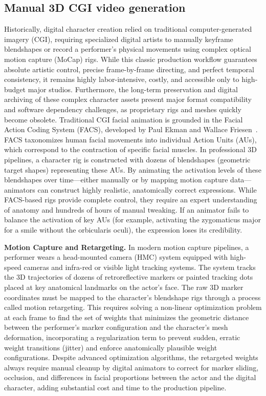 \documentclass[pdflatex,sn-mathphys-num]{sn-jnl}
\theoremstyle{thmstyleone}
\theoremstyle{thmstyletwo}
\theoremstyle{thmstylethree}
\begin{document}
\subsection{Manual 3D CGI video generation}\label{sec:manual_3d}


Historically, digital character creation relied on traditional computer-generated imagery (CGI), requiring specialized digital artists to manually keyframe blendshapes or record a performer's physical movements using complex optical motion capture (MoCap) rigs. While this classic production workflow guarantees absolute artistic control, precise frame-by-frame directing, and perfect temporal consistency, it remains highly labor-intensive, costly, and accessible only to high-budget major studios. Furthermore, the long-term preservation and digital archiving of these complex character assets present major format compatibility and software dependency challenges, as proprietary rigs and meshes quickly become obsolete. Traditional CGI facial animation is grounded in the Facial Action Coding System (FACS), developed by Paul Ekman and Wallace Friesen~\cite{ekman1978facial}. FACS taxonomizes human facial movements into individual Action Units (AUs), which correspond to the contraction of specific facial muscles. In professional 3D pipelines, a character rig is constructed with dozens of blendshapes (geometric target shapes) representing these AUs. By animating the activation levels of these blendshapes over time—either manually or by mapping motion capture data—animators can construct highly realistic, anatomically correct expressions. While FACS-based rigs provide complete control, they require an expert understanding of anatomy and hundreds of hours of manual tweaking. If an animator fails to balance the activation of key AUs (for example, activating the zygomaticus major for a smile without the orbicularis oculi), the expression loses its credibility.

\textbf{Motion Capture and Retargeting.} In modern motion capture pipelines, a performer wears a head-mounted camera (HMC) system equipped with high-speed cameras and infra-red or visible light tracking systems. The system tracks the 3D trajectories of dozens of retroreflective markers or painted tracking dots placed at key anatomical landmarks on the actor's face. The raw 3D marker coordinates must be mapped to the character's blendshape rigs through a process called motion retargeting. This requires solving a non-linear optimization problem at each frame to find the set of weights that minimizes the geometric distance between the performer's marker configuration and the character's mesh deformation, incorporating a regularization term to prevent sudden, erratic weight transitions (jitter) and enforce anatomically plausible weight configurations. Despite advanced optimization algorithms, the retargeted weights always require manual cleanup by digital animators to correct for marker sliding, occlusion, and differences in facial proportions between the actor and the digital character, adding substantial cost and time to the production pipeline.
\end{document}
